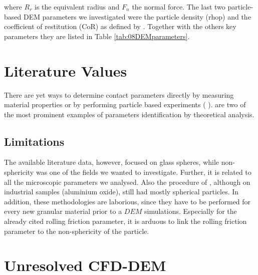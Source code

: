 

where $R_r$ is the equivalent radius and $F_n$ the normal force.
The last two particle-based \acs{DEM} parameters we investigated were 
the particle density (\acs{rhop})
and the coefficient of restitution (\acs{CoR}) as defined by
\citet{RefWorks:131}.
Together with the others key parameters they are listed in Table
\ref{tab:08DEMparameters}.\\



\section{Literature Values}
\label{sec:literaturevalues}

There are yet ways to determine contact parameters directly by measuring
material properties or by performing particle based experiments (
\cite{RefWorks:52, RefWorks:80, RefWorks:88, RefWorks:89, RefWorks:96,
RefWorks:101, RefWorks:107, RefWorks:149, RefWorks:154, RefWorks:156,
RefWorks:162, RefWorks:177, RefWorks:181, RefWorks:186}).
\citet{RefWorks:140, RefWorks:190}
are two of the most prominent examples of parameters identification by
theoretical analysis. 

\subsection{Limitations}
\label{subsec:limitations}

The available literature data, however, focused on glass spheres, while
non-sphericity was one of the fields we wanted to investigate. 
Further, it is related to all the microscopic parameters we analysed. 
Also the procedure of \citet{RefWorks:177}, although on
industrial samples (aluminium oxide), still had mostly spherical particles. 
In addition, these methodologies are laborious, 
since they have to be performed for every new granular material prior to a $DEM$
simulations. 
Especially for the already cited rolling friction parameter, it is arduous to
link the rolling friction parameter to the non-sphericity of the particle. 


\section{Unresolved CFD-DEM}
\label{sec:unresolvedcfddem}

